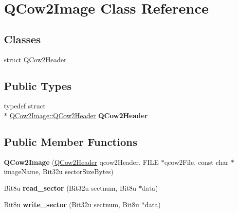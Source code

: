 \hypertarget{classQCow2Image}{\section{Q\-Cow2\-Image Class Reference}
\label{classQCow2Image}
}
\subsection*{Classes}
\begin{DoxyCompactItemize}
\item 
struct \hyperlink{structQCow2Image_1_1QCow2Header}{Q\-Cow2\-Header}
\end{DoxyCompactItemize}
\subsection*{Public Types}
\begin{DoxyCompactItemize}
\item 
\hypertarget{classQCow2Image_a91ffff9040ea06b3ead51fc720534e0c}{typedef struct \\*
\hyperlink{structQCow2Image_1_1QCow2Header}{Q\-Cow2\-Image\-::\-Q\-Cow2\-Header} {\bfseries Q\-Cow2\-Header}}\label{classQCow2Image_a91ffff9040ea06b3ead51fc720534e0c}

\end{DoxyCompactItemize}
\subsection*{Public Member Functions}
\begin{DoxyCompactItemize}
\item 
\hypertarget{classQCow2Image_a057a2fd7277b4a07f7d8797ff295259e}{{\bfseries Q\-Cow2\-Image} (\hyperlink{structQCow2Image_1_1QCow2Header}{Q\-Cow2\-Header} qcow2\-Header, F\-I\-L\-E $\ast$qcow2\-File, const char $\ast$image\-Name, Bit32u sector\-Size\-Bytes)}\label{classQCow2Image_a057a2fd7277b4a07f7d8797ff295259e}

\item 
\hypertarget{classQCow2Image_a3611df48057795bd0dc7283e5c16489d}{Bit8u {\bfseries read\-\_\-sector} (Bit32u sectnum, Bit8u $\ast$data)}\label{classQCow2Image_a3611df48057795bd0dc7283e5c16489d}

\item 
\hypertarget{classQCow2Image_abff01750b375bf45c3437e0af94b69c7}{Bit8u {\bfseries write\-\_\-sector} (Bit32u sectnum, Bit8u $\ast$data)}\label{classQCow2Image_abff01750b375bf45c3437e0af94b69c7}

\end{DoxyCompactItemize}
